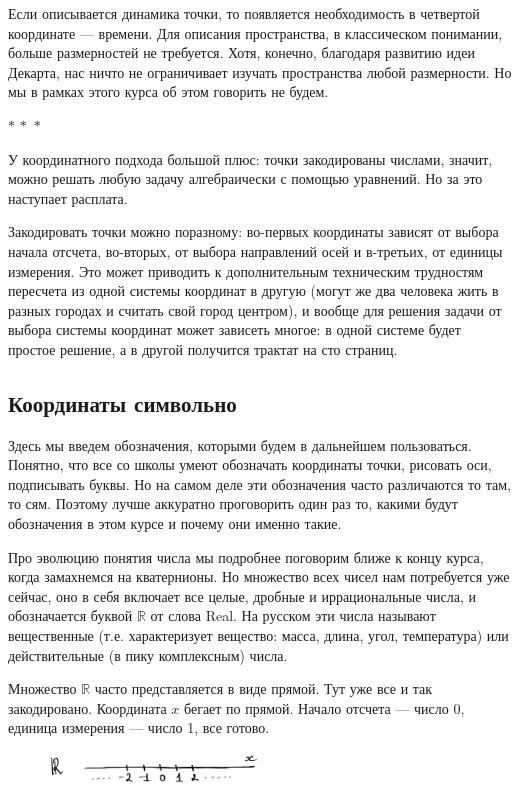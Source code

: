 \documentclass[a4paper,12pt]{article}
\newcommand{\R}{\mathbb{R}}
\newcommand{\threestars}{\begin{center}$ {\ast}\,{\ast}\,{\ast} $\end{center}}
\newcounter{th-counter}
\begin{document}
Если описывается динамика точки, то появляется необходимость в четвертой координате --- времени. Для описания пространства, в классическом понимании, больше размерностей не требуется. Хотя, конечно, благодаря развитию идеи Декарта, нас ничто не ограничивает изучать пространства любой размерности. Но мы в рамках этого курса об этом говорить не будем.

\threestars
У координатного подхода большой плюс: точки закодированы числами, значит, можно решать любую задачу алгебраически с помощью уравнений. Но за это наступает расплата.

Закодировать точки можно поразному: во-первых координаты зависят от выбора начала отсчета, во-вторых, от выбора направлений осей и в-третьих, от единицы измерения. Это может приводить к дополнительным техническим трудностям пересчета из одной системы координат в другую (могут же два человека жить в разных городах и считать свой город центром), и вообще для решения задачи от выбора системы координат может зависеть многое: в одной системе будет простое решение, а в другой получится трактат на сто страниц.

\subsection*{Координаты символьно}
Здесь мы введем обозначения, которыми будем в дальнейшем пользоваться. Понятно, что все со школы умеют обозначать координаты точки, рисовать оси, подписывать буквы. Но на самом деле эти обозначения часто различаются то там, то сям. Поэтому лучше аккуратно проговорить один раз то, какими будут обозначения в этом курсе и почему они именно такие.

Про эволюцию понятия числа мы подробнее поговорим ближе к концу курса, когда замахнемся на кватернионы. Но множество всех чисел нам потребуется уже сейчас, оно в себя включает все целые, дробные и иррациональные числа, и обозначается буквой $\mathbb{R}$ от слова Real. На русском эти числа называют вещественные (т.е. характеризует вещество: масса, длина, угол, температура) или действительные (в пику комплексным) числа.

Множество $\R$ часто представляется в виде прямой. Тут уже все и так закодировано. Координата $x$ бегает по прямой. Начало отсчета --- число 0, единица измерения --- число 1, все готово.

\begin{figure}[h] %
    \centering
    \includegraphics[width=0.5\textwidth]{pictures/one_dimensional_line.jpg}
\end{figure}
\end{document}
